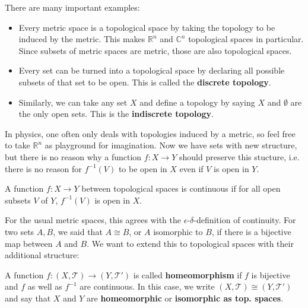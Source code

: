 \begin{eg}
    There are many important examples:
    \begin{itemize}
        \item Every metric space is a topological space by taking the topology to be induced by the metric. This makes $\mathbb{R}^n$ and $\mathbb{C}^n$ topological spaces in particular. Since subsets of metric spaces are metric, those are also topological spaces.
        \item {} Every set can be turned into a topological space by declaring all possible subsets of that set to be open. This is called the \textbf{discrete topology}.
        \item Similarly, we can take any set $X$ and define a topology by saying $X$ and $\emptyset$ are the only open sets. This is the \textbf{indiscrete topology}.  
    \end{itemize}
\end{eg}
In physics, one often only deals with topologies induced by a metric, so feel free to take $\mathbb{R}^n$ as playground for imagination. Now we have sets with new structure, but there is no reason why a function $f: X \to Y$ should preserve this stucture, i.e. there is no reason for $f^{-1}(V)$ to be open in $X$ even if $V$ is open in $Y$.
\begin{definition}[Continuity]
    A function $f: X \to Y$ between topological spaces is continuous if for all open subsets $V$ of $Y$, $f^{-1}(V)$ is open in $X$. 
\end{definition}
For the usual metric spaces, this agrees with the $\epsilon$-$\delta$-definition of continuity.
For two sets $A,B$, we said that $A \cong B$, or $A$ isomorphic to $B$, if there is a bijective map between $A$ and $B$. We want to extend this to topological spaces with their additional structure:
\begin{definition}[Homeomorphism]
    A function $f: (X, \mathcal{T}) \to (Y, \mathcal{T}')$ is called \textbf{homeomorphism} if $f$ is bijective and $f$ as well as $f^{-1}$ are continuous. In this case, we write $(X, \mathcal{T}) \cong (Y, \mathcal{T}')$ and say that $X$ and $Y$ are \textbf{homeomorphic} or \textbf{isomorphic as top. spaces}.
\end{definition}
